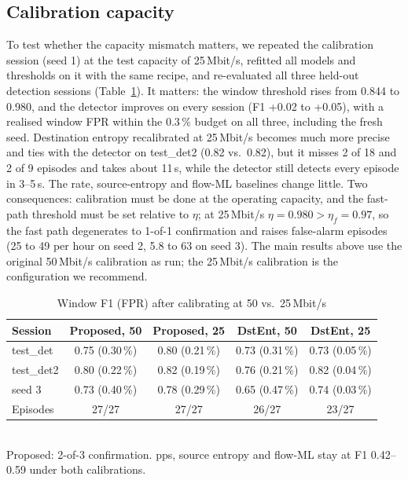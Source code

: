 \documentclass[conference]{IEEEtran}
\begin{document}
\subsection{Calibration capacity}\label{sec:cap}
To test whether the capacity mismatch matters, we repeated the calibration session (seed 1) at the test capacity of 25\,Mbit/s, refitted all models and thresholds on it with the same recipe, and re-evaluated all three held-out detection sessions (Table~\ref{tab:cap}). It matters: the window threshold rises from 0.844 to 0.980, and the detector improves on every session (F1 +0.02 to +0.05), with a realised window FPR within the 0.3\,\% budget on all three, including the fresh seed. Destination entropy recalibrated at 25\,Mbit/s becomes much more precise and ties with the detector on test\_det2 (0.82 vs.\ 0.82), but it misses 2 of 18 and 2 of 9 episodes and takes about 11\,s, while the detector still detects every episode in 3--5\,s. The rate, source-entropy and flow-ML baselines change little. Two consequences: calibration must be done at the operating capacity, and the fast-path threshold must be set relative to $\eta$; at 25\,Mbit/s $\eta=0.980>\eta_f=0.97$, so the fast path degenerates to 1-of-1 confirmation and raises false-alarm episodes (25 to 49 per hour on seed 2, 5.8 to 63 on seed 3). The main results above use the original 50\,Mbit/s calibration as run; the 25\,Mbit/s calibration is the configuration we recommend.

\begin{table}[t]
\caption{Window F1 (FPR) after calibrating at 50 vs.\ 25\,Mbit/s}
\label{tab:cap}
\centering
\footnotesize
\setlength{\tabcolsep}{2.4pt}
\begin{tabular}{lcccc}
\toprule
Session & Proposed, 50 & Proposed, 25 & DstEnt, 50 & DstEnt, 25 \\
\midrule
test\_det & 0.75 (0.30\,\%) & 0.80 (0.21\,\%) & 0.73 (0.31\,\%) & 0.73 (0.05\,\%) \\
test\_det2 & 0.80 (0.22\,\%) & 0.82 (0.19\,\%) & 0.76 (0.21\,\%) & 0.82 (0.04\,\%) \\
seed 3 & 0.73 (0.40\,\%) & 0.78 (0.29\,\%) & 0.65 (0.47\,\%) & 0.74 (0.03\,\%) \\
\midrule
Episodes & 27/27 & 27/27 & 26/27 & 23/27 \\
\bottomrule
\end{tabular}\\[2pt]
\footnotesize Proposed: 2-of-3 confirmation. pps, source entropy and flow-ML stay at F1 0.42--0.59 under both calibrations.
\end{table}
\end{document}
